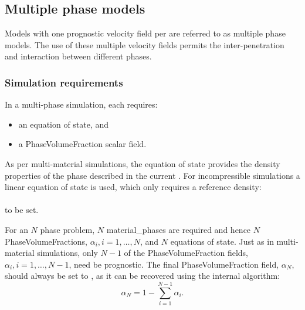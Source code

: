 \subsection{Multiple phase models}
Models with one prognostic velocity field per  are referred to as multiple phase models. The use of these multiple velocity fields permits the inter-penetration and interaction between different phases.

\subsubsection{Simulation requirements}
In a multi-phase simulation, each  requires:
\begin{itemize}
 \item an equation of state, and
 \item a PhaseVolumeFraction scalar field.
\end{itemize}

As per multi-material simulations, the equation of state provides the density properties of the phase described in the current . For incompressible simulations a linear equation of state is used, which only requires a reference density:\\
\\
to be set.

For an $N$ phase problem, $N$ material\_phases are required and hence $N$ PhaseVolumeFractions, $\alpha_i, i = 1, \ldots, N$, and $N$ equations of state. Just as in multi-material simulations, only $N-1$ of the PhaseVolumeFraction fields, $\alpha_i, i = 1, \ldots, N-1$, need be prognostic. The final PhaseVolumeFraction field, $\alpha_N$, should always be set to , as it can be recovered using the internal algorithm:
\begin{equation}
\alpha_N = 1 - \sum_{i=1}^{N-1}\alpha_i\textrm{.}
\end{equation}

